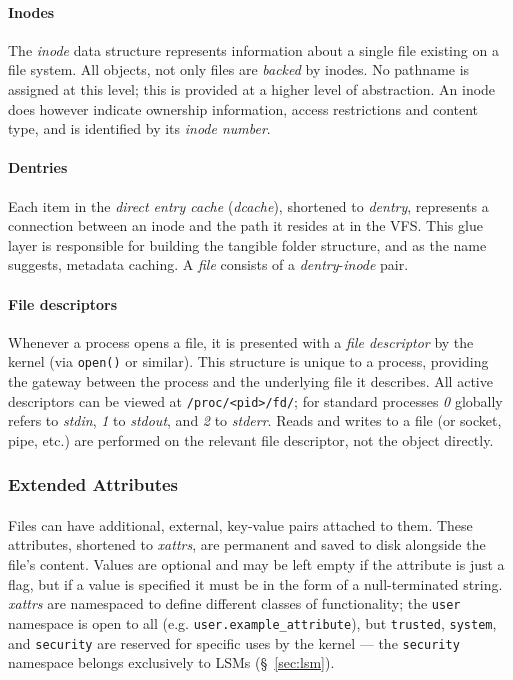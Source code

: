 \paragraph{Inodes} The \textit{inode} data structure represents information about a single file existing on a file system. All objects, not only files are \textit{backed} by inodes. No pathname is assigned at this level; this is provided at a higher level of abstraction. An inode does however indicate ownership information, access restrictions and content type, and is identified by its \textit{inode number}.

\paragraph{Dentries} Each item in the \textit{direct entry cache} (\textit{dcache}), shortened to \textit{dentry}, represents a connection between an inode and the path it resides at in the VFS. This glue layer is responsible for building the tangible folder structure, and as the name suggests, metadata caching. A \textit{file} consists of a \textit{dentry}-\textit{inode} pair.

\paragraph{File descriptors} Whenever a process opens a file, it is presented with a \textit{file descriptor} by the kernel (via \texttt{open()} or similar). This structure is unique to a process, providing the gateway between the process and the underlying file it describes. All active descriptors can be viewed at \texttt{/proc/<pid>/fd/}; for standard processes \textit{0} globally refers to \textit{stdin}, \textit{1} to \textit{stdout}, and \textit{2} to \textit{stderr}. Reads and writes to a file (or socket, pipe, etc.) are performed on the relevant file descriptor, not the object directly.

\subsubsection{Extended Attributes} 

\paragraph{} Files can have additional, external, key-value pairs attached to them. These attributes, shortened to \textit{xattrs}, are permanent and saved to disk alongside the file's content. Values are optional and may be left empty if the attribute is just a flag, but if a value is specified it must be in the form of a null-terminated string. \textit{xattrs} are namespaced to define different classes of functionality; the \texttt{user} namespace is open to all (e.g. \texttt{user.example\_attribute}), but \texttt{trusted}, \texttt{system}, and \texttt{security} are reserved for specific uses by the kernel --- the \texttt{security} namespace belongs exclusively to LSMs (§~\ref{sec:lsm}).




